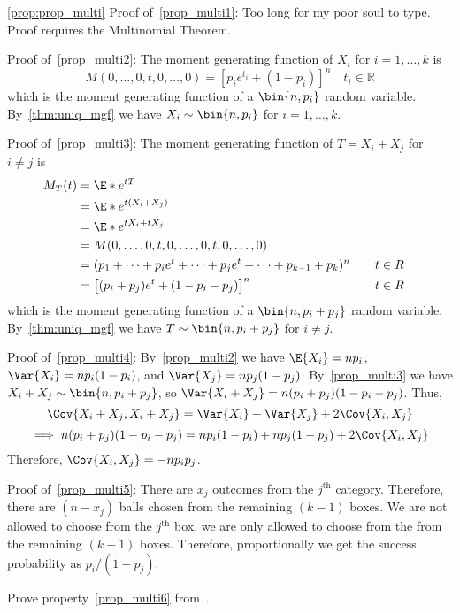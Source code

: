 \begin{Proof}{\ref{prop:prop_multi}}{}
    Proof of~\ref{prop_multi1}: Too long
    for my poor soul to type. Proof requires the Multinomial Theorem.

    Proof of~\ref{prop_multi2}: The moment
    generating function of $ X_i $ for $ i=1,\ldots,k $ is
    \[ M(0,\ldots,0,t,0,\ldots,0)=\left[ p_i e^{t_i}+(1-p_i) \right]^n
        \quad t_i\in\mathbb{R} \]
    which is the moment generating function of a
    $ \bin{n,p_i} $ random variable. By~\ref{thm:uniq_mgf}
    we have $ X_i \sim \bin{n,p_i} $ for $ i=1,\ldots,k $.

    Proof of~\ref{prop_multi3}: The moment
    generating function of $ T=X_i+X_j $ for $ i\neq j $ is
    \begin{align*}
        M_T(t)
         & =\E*{e^{tT}}                                                                         \\
         & =\E*{e^{t(X_i+X_j)}}                                                                 \\
         & =\E*{e^{t X_i+t X_j}}                                                                \\
         & =M(0,\ldots,0,t,0,\ldots,0,t,0,\ldots,0)                                             \\
         & =(p_1+\cdots+p_i e^{t}+\cdots+p_j e^t+\cdots+p_{k-1}+p_k)^n & \quad & t\in\mathbb{R} \\
         & =\left[ (p_i+p_j)e^t+(1-p_i-p_j) \right]^n                  &       & t\in\mathbb{R}
    \end{align*}
    which is the moment generating function of a
    $ \bin{n,p_i+p_j} $ random variable. By~\ref{thm:uniq_mgf}
    we have $ T \sim \bin{n,p_i+p_j} $ for $ i\neq j $.

    Proof of~\ref{prop_multi4}:
    By~\ref{prop_multi2} we have $ \E{X_i}=n p_i $, $ \Var{X_i}=np_i(1-p_i) $,
    and $ \Var{X_j}=np_j(1-p_j) $. By~\ref{prop_multi3} we have
    $ X_i+X_j \sim \bin{n,p_i+p_j} $, so
    $ \Var{X_i+X_j}=n(p_i+p_j)(1-p_i-p_j) $.
    Thus,
    \[ \Cov{X_i+X_j,X_i+X_j}=\Var{X_i}+\Var{X_j}+2\Cov{X_i,X_j} \]
    \[ \implies n(p_i+p_j)(1-p_i-p_j)=np_i(1-p_i)+np_j(1-p_j)
        +2\Cov{X_i,X_j} \]
    Therefore, $ \Cov{X_i,X_j}=-n p_i p_j $.

    Proof of~\ref{prop_multi5}: There are $ x_j $ outcomes
    from the $ j^{\text{th}} $ category. Therefore,
    there are $ (n-x_j) $ balls chosen from the remaining $ (k-1) $
    boxes. We are not allowed to choose from the $ j^{\text{th}} $ box,
    we are only allowed to choose from the from the remaining $ (k-1) $
    boxes. Therefore, proportionally we get the success probability
    as $ p_i/(1-p_j) $.
\end{Proof}
\begin{Exercise}{}{}
    Prove property~\ref{prop_multi6} from~.
\end{Exercise}
